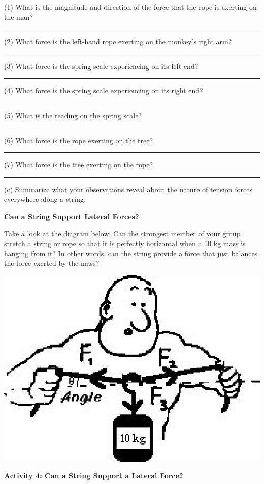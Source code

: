 (1) What is the magnitude and direction of the force that the rope is exerting
on the man? \rule{1.0in}{0.1pt}

(2) What force is the left-hand rope exerting on the monkey's right arm? \rule{1.0in}{0.1pt}

(3) What force is the spring scale experiencing on its left end? \rule{1.0in}{0.1pt}

(4) What force is the spring scale experiencing on its right end? \rule{1.0in}{0.1pt}

(5) What is the reading on the spring scale? \rule{1.0in}{0.1pt}

(6) What force is the rope exerting on the tree? \rule{1.0in}{0.1pt}

(7) What force is the tree exerting on the rope? \rule{1.0in}{0.1pt}

(c) Summarize what your observations reveal about the nature of tension forces
everywhere along a string.
\answerspace{20mm}

\textbf{Can a String Support Lateral Forces? }

Take a look at the diagram below. Can the strongest member of your group stretch
a string or rope so that it is perfectly horizontal when a 10 kg mass is hanging
from it? In other words, can the string provide a force that just balances the
force exerted by the mass?

\vspace{0.3cm}
{\par\centering \includegraphics{newton/newton_fig7.eps} \par}
\answerspace{0.5cm}

\pagebreak[2]
\textbf{Activity 4: Can a String Support a Lateral Force?} 

